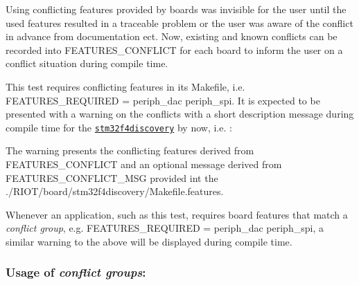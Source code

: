Using conflicting features provided by boards was invisible for the user until the used features resulted in a traceable problem or the user was aware of the conflict in advance from documentation ect. Now, existing and known conflicts can be recorded into {\ttfamily F\+E\+A\+T\+U\+R\+E\+S\+\_\+\+C\+O\+N\+F\+L\+I\+CT} for each board to inform the user on a conflict situation during compile time.

This test requires conflicting features in its {\ttfamily Makefile}, i.\+e. {\ttfamily F\+E\+A\+T\+U\+R\+E\+S\+\_\+\+R\+E\+Q\+U\+I\+R\+ED = periph\+\_\+dac periph\+\_\+spi}. It is expected to be presented with a warning on the conflicts with a short description message during compile time for the \href{https://github.com/RIOT-OS/RIOT/wiki/Board%3A-STM32F4discovery}{\tt stm32f4discovery} by now, i.\+e. \+:


 The warning presents the conflicting features derived from {\ttfamily F\+E\+A\+T\+U\+R\+E\+S\+\_\+\+C\+O\+N\+F\+L\+I\+CT} and an optional message derived from {\ttfamily F\+E\+A\+T\+U\+R\+E\+S\+\_\+\+C\+O\+N\+F\+L\+I\+C\+T\+\_\+\+M\+SG} provided int the {\ttfamily ./\+R\+I\+O\+T/board/stm32f4discovery/\+Makefile.features}.

Whenever an application, such as this test, requires board features that match a {\itshape conflict group}, e.\+g. {\ttfamily F\+E\+A\+T\+U\+R\+E\+S\+\_\+\+R\+E\+Q\+U\+I\+R\+ED = periph\+\_\+dac periph\+\_\+spi}, a similar warning to the above will be displayed during compile time.



 \subsubsection*{Usage of {\itshape conflict groups}\+:}


